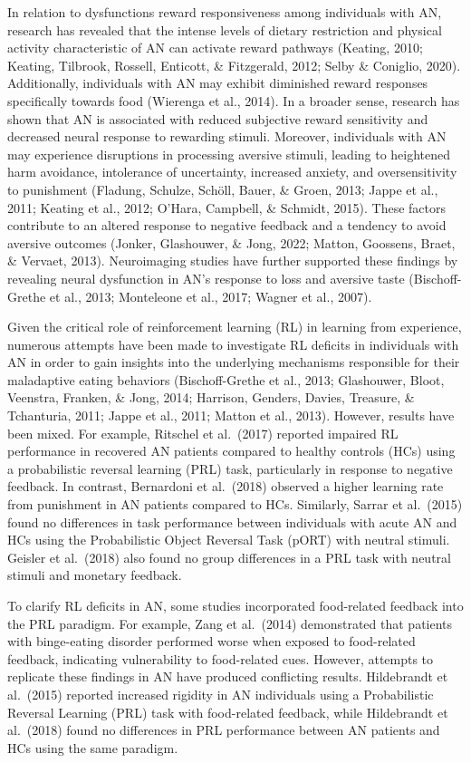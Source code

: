 \documentclass[
  man,floatsintext]{apa6}
\begin{document}
In relation to dysfunctions reward responsiveness among individuals with AN, research has revealed that the intense levels of dietary restriction and physical activity characteristic of AN can activate reward pathways (Keating, 2010; Keating, Tilbrook, Rossell, Enticott, \& Fitzgerald, 2012; Selby \& Coniglio, 2020). Additionally, individuals with AN may exhibit diminished reward responses specifically towards food (Wierenga et al., 2014). In a broader sense, research has shown that AN is associated with reduced subjective reward sensitivity and decreased neural response to rewarding stimuli. Moreover, individuals with AN may experience disruptions in processing aversive stimuli, leading to heightened harm avoidance, intolerance of uncertainty, increased anxiety, and oversensitivity to punishment (Fladung, Schulze, Schöll, Bauer, \& Groen, 2013; Jappe et al., 2011; Keating et al., 2012; O'Hara, Campbell, \& Schmidt, 2015). These factors contribute to an altered response to negative feedback and a tendency to avoid aversive outcomes (Jonker, Glashouwer, \& Jong, 2022; Matton, Goossens, Braet, \& Vervaet, 2013). Neuroimaging studies have further supported these findings by revealing neural dysfunction in AN's response to loss and aversive taste (Bischoff-Grethe et al., 2013; Monteleone et al., 2017; Wagner et al., 2007).

Given the critical role of reinforcement learning (RL) in learning from experience, numerous attempts have been made to investigate RL deficits in individuals with AN in order to gain insights into the underlying mechanisms responsible for their maladaptive eating behaviors (Bischoff-Grethe et al., 2013; Glashouwer, Bloot, Veenstra, Franken, \& Jong, 2014; Harrison, Genders, Davies, Treasure, \& Tchanturia, 2011; Jappe et al., 2011; Matton et al., 2013). However, results have been mixed. For example, Ritschel et al.~(2017) reported impaired RL performance in recovered AN patients compared to healthy controls (HCs) using a probabilistic reversal learning (PRL) task, particularly in response to negative feedback. In contrast, Bernardoni et al.~(2018) observed a higher learning rate from punishment in AN patients compared to HCs. Similarly, Sarrar et al.~(2015) found no differences in task performance between individuals with acute AN and HCs using the Probabilistic Object Reversal Task (pORT) with neutral stimuli. Geisler et al.~(2018) also found no group differences in a PRL task with neutral stimuli and monetary feedback.

To clarify RL deficits in AN, some studies incorporated food-related feedback into the PRL paradigm. For example, Zang et al.~(2014) demonstrated that patients with binge-eating disorder performed worse when exposed to food-related feedback, indicating vulnerability to food-related cues. However, attempts to replicate these findings in AN have produced conflicting results. Hildebrandt et al.~(2015) reported increased rigidity in AN individuals using a Probabilistic Reversal Learning (PRL) task with food-related feedback, while Hildebrandt et al.~(2018) found no differences in PRL performance between AN patients and HCs using the same paradigm.
\end{document}
